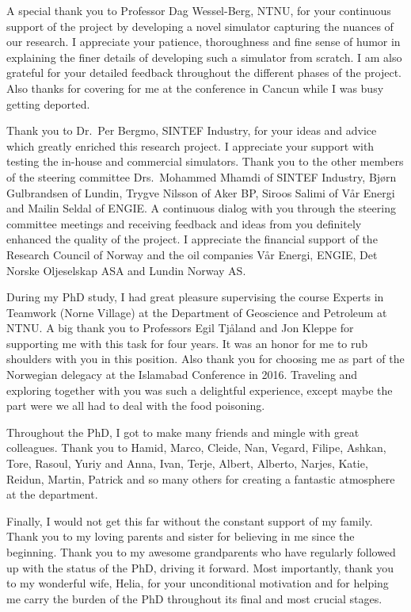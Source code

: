 A special thank you to Professor Dag Wessel-Berg, NTNU, for your continuous support of the project by developing a novel simulator capturing the nuances of our research. I appreciate your patience, thoroughness and fine sense of humor in explaining the finer details of developing such a simulator from scratch. I am also grateful for your detailed feedback throughout the different phases of the project. Also thanks for covering for me at the conference in Cancun while I was busy getting deported.

Thank you to Dr.\ Per Bergmo, SINTEF Industry, for your ideas and advice which greatly enriched this research project. I appreciate your support with testing the in-house and commercial simulators. Thank you to the other members of the steering committee Drs.\ Mohammed Mhamdi of SINTEF Industry, Bjørn Gulbrandsen of Lundin, Trygve Nilsson of Aker BP, Siroos Salimi of Vår Energi and Mailin Seldal of ENGIE. A continuous dialog with you through the steering committee meetings and receiving feedback and ideas from you definitely enhanced the quality of the project. I appreciate the financial support of the Research Council of Norway and the oil companies Vår Energi, ENGIE, Det Norske Oljeselskap ASA and Lundin Norway AS.

During my PhD study, I had great pleasure supervising the course Experts in Teamwork (Norne Village) at the Department of Geoscience and Petroleum at NTNU. A big thank you to Professors Egil Tjåland and Jon Kleppe for supporting me with this task for four years. It was an honor for me to rub shoulders with you in this position. Also thank you for choosing me as part of the Norwegian delegacy at the Islamabad Conference in 2016. Traveling and exploring together with you was such a delightful experience, except maybe the part were we all had to deal with the food poisoning.    

Throughout the PhD, I got to make many friends and mingle with great colleagues. Thank you to Hamid, Marco, Cleide, Nan, Vegard, Filipe, Ashkan, Tore, Rasoul, Yuriy and Anna, Ivan, Terje, Albert, Alberto, Narjes, Katie, Reidun, Martin, Patrick and so many others for creating a fantastic atmosphere at the department.  

Finally, I would not get this far without the constant support of my family. Thank you to my loving parents and sister for believing in me since the beginning. Thank you to my awesome grandparents who have regularly followed up with the status of the PhD, driving it forward. Most importantly, thank you to my wonderful wife, Helia, for your unconditional motivation and for helping me carry the burden of the PhD throughout its final and most crucial stages.  


